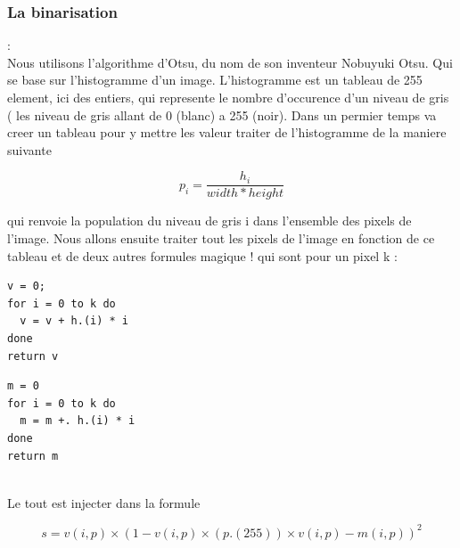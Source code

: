 \documentclass{article}
\begin{document}
\subsubsection{La binarisation}
:\\
Nous utilisons l'algorithme d'Otsu, du nom de son inventeur Nobuyuki Otsu. Qui se base sur l'histogramme d'un image. L'histogramme est un tableau de 255 element, ici des entiers, qui represente le nombre d'occurence d'un niveau de gris ( les niveau de gris allant de 0 (blanc) a 255 (noir). Dans un permier temps va creer un tableau pour y mettre les valeur traiter de l'histogramme de la maniere suivante 
\begin{center}
\[ p_{i} = \frac{h_{i}} {width * height}\]
\end{center}
qui renvoie la population du niveau de gris i dans l'ensemble des pixels de l'image.
Nous allons ensuite traiter tout les pixels de l'image en fonction de ce tableau et de deux autres formules magique ! qui sont pour un pixel k :\\
\begin{minipage}[h]{5cm}
\begin{lstlisting}
v = 0;
for i = 0 to k do 
  v = v + h.(i) * i 
done
return v
\end{lstlisting}
\end{minipage}
\begin{minipage}[h]{5cm}
\begin{lstlisting}
m = 0
for i = 0 to k do
  m = m +. h.(i) * i
done 
return m
\end{lstlisting}
\end{minipage}
\vspace{0.8cm}
\\Le tout est injecter dans la formule

\[ s = v(i,p) \times (1 - v(i,p) \times (p.(255)) \times v(i,p) - m(i,p))^{2}\]
 
\end{document}
